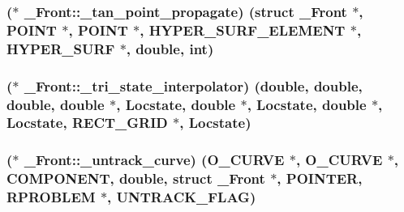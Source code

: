 \subsubsection[{\texorpdfstring{\+\_\+tan\+\_\+point\+\_\+propagate}{_tan_point_propagate}}]{($\ast$ \+\_\+\+Front\+::\+\_\+tan\+\_\+point\+\_\+propagate) (struct {\bf \+\_\+\+Front} $\ast$, {\bf P\+O\+I\+NT} $\ast$, {\bf P\+O\+I\+NT} $\ast$, {\bf H\+Y\+P\+E\+R\+\_\+\+S\+U\+R\+F\+\_\+\+E\+L\+E\+M\+E\+NT} $\ast$, {\bf H\+Y\+P\+E\+R\+\_\+\+S\+U\+RF} $\ast$, double, int)}\hypertarget{struct___front_acfe36580b8246c1598bed25bd74d9970}{}\label{struct___front_acfe36580b8246c1598bed25bd74d9970}
\subsubsection[{\texorpdfstring{\+\_\+tri\+\_\+state\+\_\+interpolator}{_tri_state_interpolator}}]{($\ast$ \+\_\+\+Front\+::\+\_\+tri\+\_\+state\+\_\+interpolator) (double, double, double, double $\ast$, {\bf Locstate}, double $\ast$, {\bf Locstate}, double $\ast$, {\bf Locstate}, {\bf R\+E\+C\+T\+\_\+\+G\+R\+ID} $\ast$, {\bf Locstate})}\hypertarget{struct___front_abc6fd9d9ae792a8b5d5747d9a5af1d8f}{}\label{struct___front_abc6fd9d9ae792a8b5d5747d9a5af1d8f}
\subsubsection[{\texorpdfstring{\+\_\+untrack\+\_\+curve}{_untrack_curve}}]{($\ast$ \+\_\+\+Front\+::\+\_\+untrack\+\_\+curve) ({\bf O\+\_\+\+C\+U\+R\+VE} $\ast$, {\bf O\+\_\+\+C\+U\+R\+VE} $\ast$, {\bf C\+O\+M\+P\+O\+N\+E\+NT}, double, struct {\bf \+\_\+\+Front} $\ast$, {\bf P\+O\+I\+N\+T\+ER}, {\bf R\+P\+R\+O\+B\+L\+EM} $\ast$, {\bf U\+N\+T\+R\+A\+C\+K\+\_\+\+F\+L\+AG})}\hypertarget{struct___front_a02b142d262b5d29e6d9b74a986a0fc57}{}\label{struct___front_a02b142d262b5d29e6d9b74a986a0fc57}
